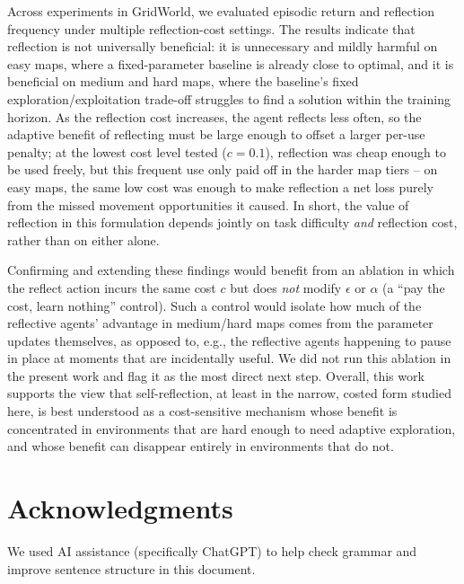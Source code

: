 \documentclass[11pt]{article}
\begin{document}
Across experiments in GridWorld, we evaluated episodic return and reflection frequency under multiple reflection-cost settings. The results indicate that reflection is not universally beneficial: it is unnecessary and mildly harmful on easy maps, where a fixed-parameter baseline is already close to optimal, and it is beneficial on medium and hard maps, where the baseline's fixed exploration/exploitation trade-off struggles to find a solution within the training horizon. As the reflection cost increases, the agent reflects less often, so the adaptive benefit of reflecting must be large enough to offset a larger per-use penalty; at the lowest cost level tested ($c=0.1$), reflection was cheap enough to be used freely, but this frequent use only paid off in the harder map tiers -- on easy maps, the same low cost was enough to make reflection a net loss purely from the missed movement opportunities it caused. In short, the value of reflection in this formulation depends jointly on task difficulty \emph{and} reflection cost, rather than on either alone.

Confirming and extending these findings would benefit from an ablation in which the reflect action incurs the same cost $c$ but does \emph{not} modify $\epsilon$ or $\alpha$ (a ``pay the cost, learn nothing'' control). Such a control would isolate how much of the reflective agents' advantage in medium/hard maps comes from the parameter updates themselves, as opposed to, e.g., the reflective agents happening to pause in place at moments that are incidentally useful. We did not run this ablation in the present work and flag it as the most direct next step. Overall, this work supports the view that self-reflection, at least in the narrow, costed form studied here, is best understood as a cost-sensitive mechanism whose benefit is concentrated in environments that are hard enough to need adaptive exploration, and whose benefit can disappear entirely in environments that do not.

\section*{Acknowledgments}
We used AI assistance (specifically ChatGPT) to help check grammar and improve sentence structure in this document.
\end{document}
